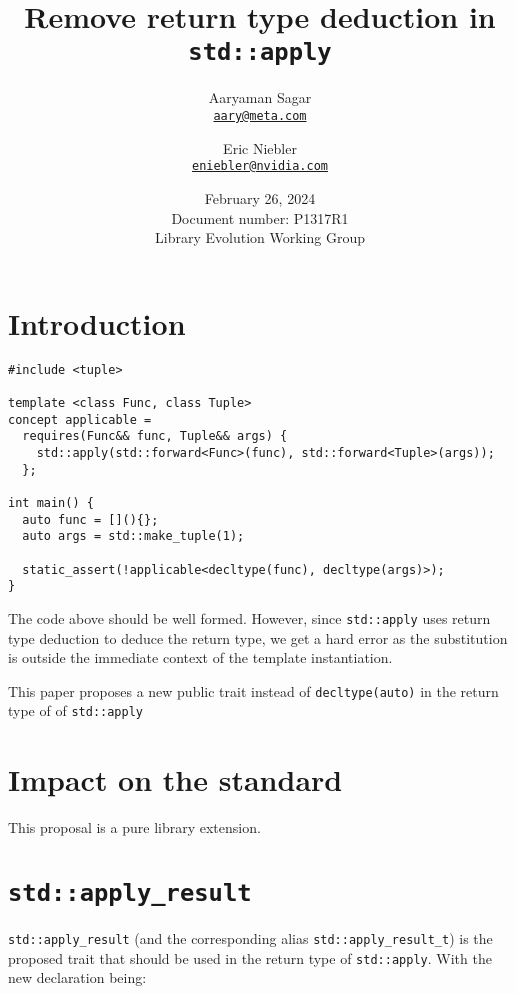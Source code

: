 \documentclass{article}
\begin{document}
\title{\textbf{Remove return type deduction in \texttt{std::apply}}}
\author{
  Aaryaman Sagar\\
  \href{mailto:aary@meta.com}{\texttt{aary@meta.com}}
  \and
  Eric Niebler\\
  \href{mailto:eniebler@nvidia.com}{\texttt{eniebler@nvidia.com}}
}
\date{February 26, 2024 \\ Document number: P1317R1 \\ Library Evolution Working Group}
\maketitle

\section{Introduction}

\begin{lstlisting}
#include <tuple>

template <class Func, class Tuple>
concept applicable =
  requires(Func&& func, Tuple&& args) {
    std::apply(std::forward<Func>(func), std::forward<Tuple>(args));
  };

int main() {
  auto func = [](){};
  auto args = std::make_tuple(1);

  static_assert(!applicable<decltype(func), decltype(args)>);
}
\end{lstlisting}

The code above should be well formed.  However, since \texttt{std::apply} uses
return type deduction to deduce the return type, we get a hard error as the
substitution is outside the immediate context of the template instantiation.

This paper proposes a new public trait instead of \texttt{decltype(auto)} in
the return type of of \texttt{std::apply}

\section{Impact on the standard}
This proposal is a pure library extension.

\section{\texttt{std::apply\_result}}
\texttt{std::apply\_result} (and the corresponding alias
\texttt{std::apply\_result\_t}) is the proposed trait that should be used in
the return type of \texttt{std::apply}.  With the new declaration being:
\end{document}
